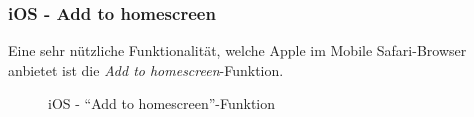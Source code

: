 \subsubsection{iOS - Add to homescreen}
Eine sehr nützliche Funktionalität, welche Apple im Mobile Safari-Browser anbietet ist die \emph{Add to homescreen}-Funktion.

\begin{figure}[H]
\hfill
{}
\hfill
{}
\hfill
{}
\caption{iOS - "`Add to homescreen"'-Funktion}
\end{figure}

